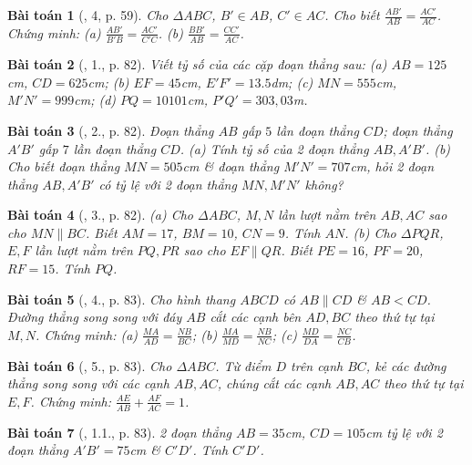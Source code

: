 \documentclass{article}
\newtheorem{baitoan}{Bài toán}
\begin{document}
\begin{baitoan}[\cite{SGK_Toan_8_tap_2}, 4, p. 59]
	Cho $\Delta ABC$, $B'\in AB$, $C'\in AC$. Cho biết $\frac{AB'}{AB} = \frac{AC'}{AC}$. Chứng minh: (a) $\frac{AB'}{B'B} = \frac{AC'}{C'C}$. (b) $\frac{BB'}{AB} = \frac{CC'}{AC}$.
\end{baitoan}

\begin{baitoan}[\cite{SBT_Toan_8_tap_2}, 1., p. 82]
	Viết tỷ số của các cặp đoạn thẳng sau: (a) $AB = 125$\emph{cm}, $CD = 625$\emph{cm}; (b) $EF = 45$\emph{cm}, $E'F' = 13.5$\emph{dm}; (c) $MN = 555$\emph{cm}, $M'N' = 999$\emph{cm}; (d) $PQ = 10101$\emph{cm}, $P'Q' = 303,03$\emph{m}.	
\end{baitoan}

\begin{baitoan}[\cite{SBT_Toan_8_tap_2}, 2., p. 82]
	Đoạn thẳng $AB$ gấp $5$ lần đoạn thẳng $CD$; đoạn thẳng $A'B'$ gấp $7$ lần đoạn thẳng $CD$. (a) Tính tỷ số của 2 đoạn thẳng $AB,A'B'$. (b) Cho biết đoạn thẳng $MN = 505$\emph{cm} \& đoạn thẳng $M'N' = 707$\emph{cm}, hỏi 2 đoạn thẳng $AB,A'B'$ có tỷ lệ với 2 đoạn thẳng $MN,M'N'$ không?
\end{baitoan}

\begin{baitoan}[\cite{SBT_Toan_8_tap_2}, 3., p. 82]
	(a) Cho $\Delta ABC$, $M,N$ lần lượt nằm trên $AB,AC$ sao cho $MN\parallel BC$. Biết $AM = 17$, $BM = 10$, $CN = 9$. Tính $AN$. (b) Cho $\Delta PQR$, $E,F$ lần lượt nằm trên $PQ,PR$ sao cho $EF\parallel QR$. Biết $PE = 16$, $PF = 20$, $RF = 15$. Tính $PQ$.
\end{baitoan}

\begin{baitoan}[\cite{SBT_Toan_8_tap_2}, 4., p. 83]
	Cho hình thang $ABCD$ có $AB\parallel CD$ \& $AB < CD$. Đường thẳng song song với đáy $AB$ cắt các cạnh bên $AD,BC$ theo thứ tự tại $M,N$. Chứng minh: (a) $\frac{MA}{AD} = \frac{NB}{BC}$; (b) $\frac{MA}{MD} = \frac{NB}{NC}$; (c) $\frac{MD}{DA} = \frac{NC}{CB}$.
\end{baitoan}

\begin{baitoan}[\cite{SBT_Toan_8_tap_2}, 5., p. 83]
	Cho $\Delta ABC$. Từ điểm $D$ trên cạnh $BC$, kẻ các đường thẳng song song với các cạnh $AB,AC$, chúng cắt các cạnh $AB,AC$ theo thứ tự tại $E,F$. Chứng minh: $\frac{AE}{AB} + \frac{AF}{AC} = 1$.
\end{baitoan}

\begin{baitoan}[\cite{SBT_Toan_8_tap_2}, 1.1., p. 83]
	2 đoạn thẳng $AB = 35$\emph{cm}, $CD = 105$\emph{cm} tỷ lệ với 2 đoạn thẳng $A'B' = 75$\emph{cm} \& $C'D'$. Tính $C'D'$.
\end{baitoan}
\end{document}
